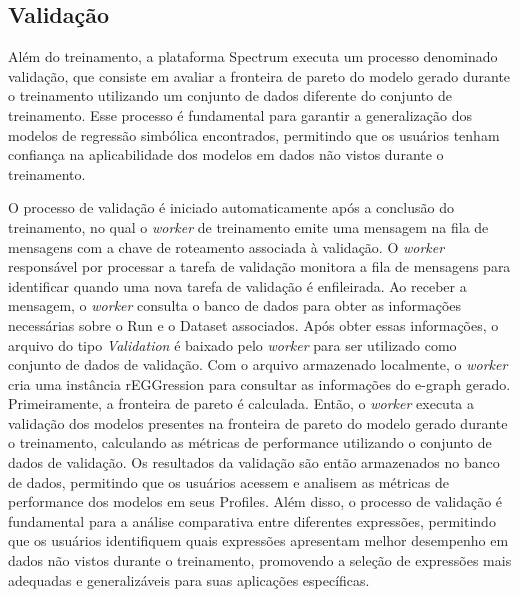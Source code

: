 \subsection{Validação}
Além do treinamento, a plataforma Spectrum executa um processo denominado validação, que consiste em avaliar a fronteira de pareto do modelo gerado durante o treinamento utilizando um conjunto de dados diferente do conjunto de treinamento. Esse processo é fundamental para garantir a generalização dos modelos de regressão simbólica encontrados, permitindo que os usuários tenham confiança na aplicabilidade dos modelos em dados não vistos durante o treinamento.

O processo de validação é iniciado automaticamente após a conclusão do treinamento, no qual o \textit{worker} de treinamento emite uma mensagem na fila de mensagens com a chave de roteamento associada à validação. O \textit{worker} responsável por processar a tarefa de validação monitora a fila de mensagens para identificar quando uma nova tarefa de validação é enfileirada. Ao receber a mensagem, o \textit{worker} consulta o banco de dados para obter as informações necessárias sobre o Run e o Dataset associados. Após obter essas informações, o arquivo do tipo \textit{Validation} é baixado pelo \textit{worker} para ser utilizado como conjunto de dados de validação. Com o arquivo armazenado localmente, o \textit{worker} cria uma instância rEGGression para consultar as informações do e-graph gerado. Primeiramente, a fronteira de pareto é calculada. Então, o \textit{worker} executa a validação dos modelos presentes na fronteira de pareto do modelo gerado durante o treinamento, calculando as métricas de performance utilizando o conjunto de dados de validação. Os resultados da validação são então armazenados no banco de dados, permitindo que os usuários acessem e analisem as métricas de performance dos modelos em seus Profiles. Além disso, o processo de validação é fundamental para a análise comparativa entre diferentes expressões, permitindo que os usuários identifiquem quais expressões apresentam melhor desempenho em dados não vistos durante o treinamento, promovendo a seleção de expressões mais adequadas e generalizáveis para suas aplicações específicas.

